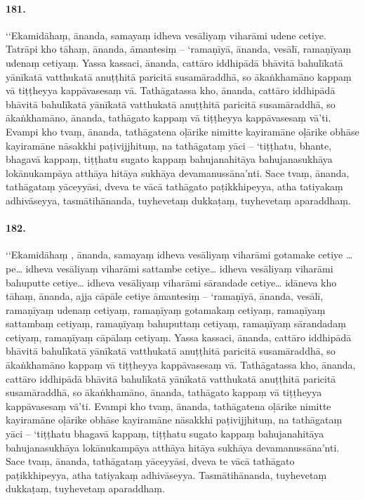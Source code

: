 \paragraph{181.} ‘‘Ekamidāhaṃ, ānanda, samayaṃ idheva vesāliyaṃ viharāmi udene cetiye. Tatrāpi kho tāhaṃ, ānanda, āmantesiṃ – ‘ramaṇīyā, ānanda, vesālī, ramaṇīyaṃ udenaṃ cetiyaṃ. Yassa kassaci, ānanda, cattāro iddhipādā bhāvitā bahulīkatā yānīkatā vatthukatā anuṭṭhitā paricitā susamāraddhā, so ākaṅkhamāno kappaṃ vā tiṭṭheyya kappāvasesaṃ vā. Tathāgatassa kho, ānanda, cattāro iddhipādā bhāvitā bahulīkatā yānīkatā vatthukatā anuṭṭhitā paricitā susamāraddhā, so ākaṅkhamāno, ānanda, tathāgato kappaṃ vā tiṭṭheyya kappāvasesaṃ vā’ti. Evampi kho tvaṃ, ānanda, tathāgatena oḷārike nimitte kayiramāne oḷārike obhāse kayiramāne nāsakkhi paṭivijjhituṃ, na tathāgataṃ yāci – ‘tiṭṭhatu, bhante, bhagavā kappaṃ, tiṭṭhatu sugato kappaṃ bahujanahitāya bahujanasukhāya lokānukampāya atthāya hitāya sukhāya devamanussāna’nti. Sace tvaṃ, ānanda, tathāgataṃ yāceyyāsi, dveva te vācā tathāgato paṭikkhipeyya, atha tatiyakaṃ adhivāseyya, tasmātihānanda, tuyhevetaṃ dukkaṭaṃ, tuyhevetaṃ aparaddhaṃ.

\paragraph{182.} ‘‘Ekamidāhaṃ , ānanda, samayaṃ idheva vesāliyaṃ viharāmi gotamake cetiye …pe… idheva vesāliyaṃ viharāmi sattambe cetiye… idheva vesāliyaṃ viharāmi bahuputte cetiye… idheva vesāliyaṃ viharāmi sārandade cetiye… idāneva kho tāhaṃ, ānanda, ajja cāpāle cetiye āmantesiṃ – ‘ramaṇīyā, ānanda, vesālī, ramaṇīyaṃ udenaṃ cetiyaṃ, ramaṇīyaṃ gotamakaṃ cetiyaṃ, ramaṇīyaṃ sattambaṃ cetiyaṃ, ramaṇīyaṃ bahuputtaṃ cetiyaṃ, ramaṇīyaṃ sārandadaṃ cetiyaṃ, ramaṇīyaṃ cāpālaṃ cetiyaṃ. Yassa kassaci, ānanda, cattāro iddhipādā bhāvitā bahulīkatā yānīkatā vatthukatā anuṭṭhitā paricitā susamāraddhā, so ākaṅkhamāno kappaṃ vā tiṭṭheyya kappāvasesaṃ vā. Tathāgatassa kho, ānanda, cattāro iddhipādā bhāvitā bahulīkatā yānīkatā vatthukatā anuṭṭhitā paricitā susamāraddhā, so ākaṅkhamāno, ānanda, tathāgato kappaṃ vā tiṭṭheyya kappāvasesaṃ vā’ti. Evampi kho tvaṃ, ānanda, tathāgatena oḷārike nimitte kayiramāne oḷārike obhāse kayiramāne nāsakkhi paṭivijjhituṃ, na tathāgataṃ yāci – ‘tiṭṭhatu bhagavā kappaṃ, tiṭṭhatu sugato kappaṃ bahujanahitāya bahujanasukhāya lokānukampāya atthāya hitāya sukhāya devamanussāna’nti. Sace tvaṃ, ānanda, tathāgataṃ yāceyyāsi, dveva te vācā tathāgato paṭikkhipeyya, atha tatiyakaṃ adhivāseyya. Tasmātihānanda, tuyhevetaṃ dukkaṭaṃ, tuyhevetaṃ aparaddhaṃ.

